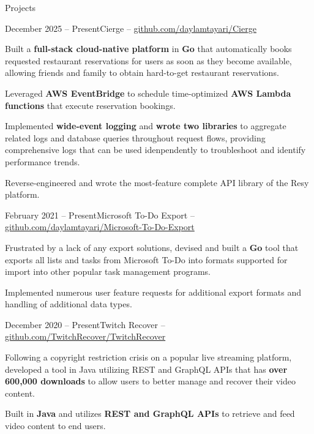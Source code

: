 \documentclass{article}
\newlength{\tabin}
\newlength{\secsep}
\newcommand{\lineunder}{\vspace*{-8pt} \\ \hspace*{-6pt} \hrulefill \\ \vspace*{-15pt}}
\newenvironment{tabbedsection}[1]{
  \begin{list}{}{
      \setlength{\itemsep}{0pt}
      \setlength{\labelsep}{0pt}
      \setlength{\labelwidth}{0pt}
      \setlength{\leftmargin}{0pt}
      \setlength{\rightmargin}{\tabin}
      \setlength{\listparindent}{0pt}
      \setlength{\parsep}{0pt}
      \setlength{\parskip}{0pt}
      \setlength{\partopsep}{0pt}
      \setlength{\topsep}{#1}
    }
  \item[]
}{\end{list}}
\newenvironment{resume_section}[1]{
  \needspace{4\baselineskip}
  \vspace{2\secsep}
  \textsc{\color{blue}\large#1}
  \lineunder
  \begin{tabbedsection}{\secsep}
}{\end{tabbedsection}}
\newenvironment{resume_subsection}[2]{
    \textbf{#2} \hfill {\normalsize \textbf{(#1)}} \hspace{-5em}
  \begin{tabbedsection}{0.5\secsep}
  \begin{subitems}
}{\end{subitems}\end{tabbedsection}}
\newenvironment{subitems}{
  \renewcommand{\labelitemi}{-}
  \begin{itemize}
      \setlength{\labelsep}{1em}
}{\end{itemize}}
\begin{document}
\begin{resume_section}{Projects}
    \begin{resume_subsection}{December 2025 -- Present}{Cierge -- \faGithub \hspace{0.01cm} {\hypersetup{urlcolor=black}\href{https://github.com/daylamtayari/Cierge}{github.com/daylamtayari/Cierge}}}
        \item Built a \textbf{full-stack cloud-native platform} in \textbf{Go} that automatically books requested restaurant reservations for users as soon as they become available, allowing friends and family to obtain hard-to-get restaurant reservations.
        \item Leveraged \textbf{AWS EventBridge} to schedule time-optimized \textbf{AWS Lambda functions} that execute reservation bookings.
        \item Implemented \textbf{wide-event logging} and \textbf{wrote two libraries} to aggregate related logs and database queries throughout request flows, providing comprehensive logs that can be used idenpendently to troubleshoot and identify performance trends.
        \item Reverse-engineered and wrote the most-feature complete API library of the Resy platform.
    \end{resume_subsection}
    \vspace{2\secsep}
    \begin{resume_subsection}{February 2021 -- Present}{Microsoft To-Do Export -- \faGithub \hspace{0.01cm} {\hypersetup{urlcolor=black}\href{https://github.com/daylamtayari/Microsoft-To-Do-Export}{github.com/daylamtayari/Microsoft-To-Do-Export}}}
        \item Frustrated by a lack of any export solutions, devised and built a \textbf{Go} tool that exports all lists and tasks from Microsoft To-Do into formats supported for import into other popular task management programs.
        \item Implemented numerous user feature requests for additional export formats and handling of additional data types.
    \end{resume_subsection}
    \vspace{2\secsep}
    \begin{resume_subsection}{December 2020 -- Present}{Twitch Recover -- \faGithub \hspace{0.01cm} {\hypersetup{urlcolor=black}\href{https://github.com/twitchrecover/twitchrecover}{github.com/TwitchRecover/TwitchRecover}}}
        \item Following a copyright restriction crisis on a popular live streaming platform, developed a tool in Java utilizing REST and GraphQL APIs that has \textbf{over 600,000 downloads} to allow users to better manage and recover their video content.
        \item Built in \textbf{Java} and utilizes \textbf{REST and GraphQL APIs} to retrieve and feed video content to end users.
    \end{resume_subsection}
\end{resume_section}
\end{document}
